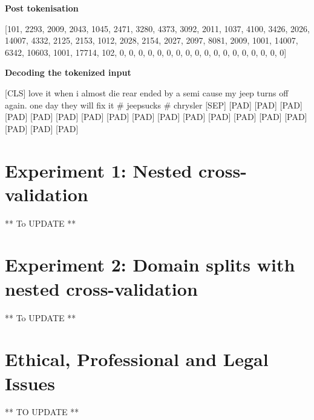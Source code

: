 \textbf{Post tokenisation}\newline

\begin{adjustbox}{minipage={\textwidth},fbox}
    [101, 2293, 2009, 2043, 1045, 2471, 3280, 4373, 3092, 2011, 1037, 4100, 3426, 2026, 14007, 4332, 2125, 2153, 1012, 2028, 2154, 2027, 2097, 8081, 2009, 1001, 14007, 6342, 10603, 1001, 17714, 102, 0, 0, 0, 0, 0, 0, 0, 0, 0, 0, 0, 0, 0, 0, 0, 0, 0, 0]
\end{adjustbox} \newline\newline

\textbf{Decoding the tokenized input}\newline

\begin{adjustbox}{minipage={\textwidth},fbox}
    [CLS] love it when i almost die rear ended by a semi cause my jeep turns off again. one day they will fix it \# jeepsucks \# chrysler [SEP] [PAD] [PAD] [PAD] [PAD] [PAD] [PAD] [PAD] [PAD] [PAD] [PAD] [PAD] [PAD] [PAD] [PAD] [PAD] [PAD] [PAD] [PAD]
\end{adjustbox} \newline\newline

\section{Experiment 1: Nested cross-validation}
** To UPDATE **

\section{Experiment 2: Domain splits with nested cross-validation}
** To UPDATE **

\section{Ethical, Professional and Legal Issues}
** TO UPDATE **
